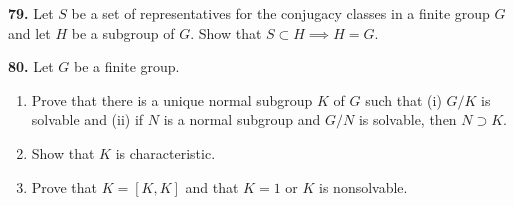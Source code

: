 \documentclass[a4paper,11pt,final]{memoir}%
\theoremstyle{nonumberplain}
\begin{document}
\medskip\noindent\textbf{79.} Let $S$ be a set of representatives for the
conjugacy classes in a finite group $G$ and let $H$ be a subgroup of $G$. Show
that $S\subset H\implies H=G$.

\medskip\noindent\textbf{80.} Let $G$ be a finite group.

\begin{enumerate}
\item Prove that there is a unique normal subgroup $K$ of $G$ such that (i)
$G/K$ is solvable and (ii) if $N$ is a normal subgroup and $G/N$ is solvable,
then $N\supset K$.

\item Show that $K$ is characteristic.

\item Prove that $K=[K,K]$ and that $K=1$ or $K$ is nonsolvable.
\end{enumerate}
\end{document}
